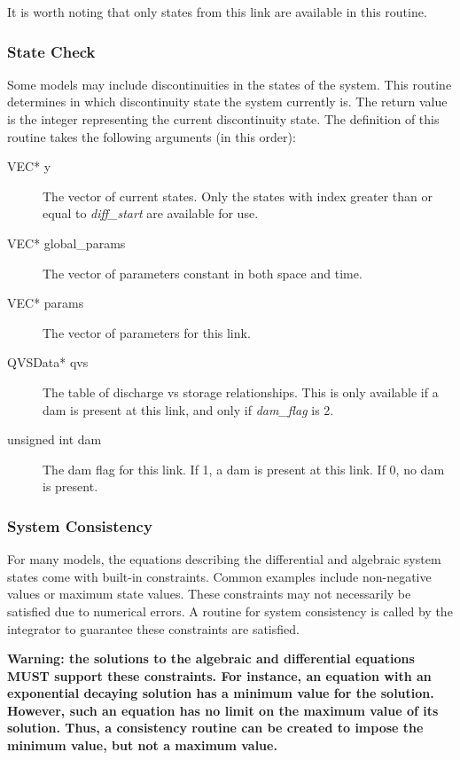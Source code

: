 \documentclass[12pt]{article}
\begin{document}
It is worth noting that only states from this link are available in this routine.


\subsubsection{State Check} \label{sec: state check}

Some models may include discontinuities in the states of the system. This routine determines in which discontinuity state the system currently is. The return value is the integer representing the current discontinuity state. The definition of this routine takes the following arguments (in this order):
\begin{description}
 \item[VEC* y] The vector of current states. Only the states with index greater than or equal to \emph{diff\_start} are available for use.
 \item[VEC* global\_params] The vector of parameters constant in both space and time.
 \item[VEC* params] The vector of parameters for this link.
 \item[QVSData* qvs] The table of discharge vs storage relationships. This is only available if a dam is present at this link, and only if \emph{dam\_flag} is 2.
 \item[unsigned int dam] The dam flag for this link. If 1, a dam is present at this link. If 0, no dam is present.
\end{description}


\subsubsection{System Consistency} \label{sec: system consistency}

For many models, the equations describing the differential and algebraic system states come with built-in constraints. Common examples include non-negative values or maximum state values. These constraints may not necessarily be satisfied due to numerical errors. A routine for system consistency is called by the integrator to guarantee these constraints are satisfied.

\textbf{Warning: the solutions to the algebraic and differential equations MUST support these constraints. For instance, an equation with an exponential decaying solution has a minimum value for the solution. However, such an equation has no limit on the maximum value of its solution. Thus, a consistency routine can be created to impose the minimum value, but not a maximum value.}
\end{document}
